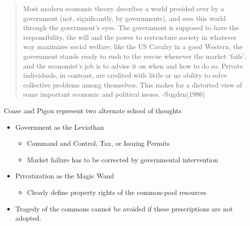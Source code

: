 \begin{frame}{}
\protect\hypertarget{section-37}{}

\begin{quote}
Most modern economic theory describes a world presided over by a
government (not, significantly, by governments), and sees this world
through the government's eyes. The government is supposed to have the
responsibility, the will and the power to restructure society in
whatever way maximizes social welfare; like the US Cavalry in a good
Western, the government stands ready to rush to the rescue whenever the
market `fails', and the economist's job is to advise it on when and how
to do so. Private individuals, in contrast, are credited with little or
no ability to solve collective problems among themselves. This makes for
a distorted view of some important economic and political issues.
-Sugden(1986)
\end{quote}

\end{frame}

\begin{frame}{Coase and Pigou represent two alternate school of
thoughts}
\protect\hypertarget{coase-and-pigou-represent-two-alternate-school-of-thoughts}{}

\begin{itemize}
\tightlist
\item
  Government as the Leviathan

  \begin{itemize}
  \tightlist
  \item
    Command and Control, Tax, or Issuing Permits
  \item
    Market failure has to be corrected by governmental intervention
  \end{itemize}
\item
  Privatization as the Magic Wand

  \begin{itemize}
  \tightlist
  \item
    Clearly define property rights of the common-pool resources
  \end{itemize}
\item
  Tragedy of the commons cannot be avoided if these prescriptions are
  not adopted.
\end{itemize}

\end{frame}

